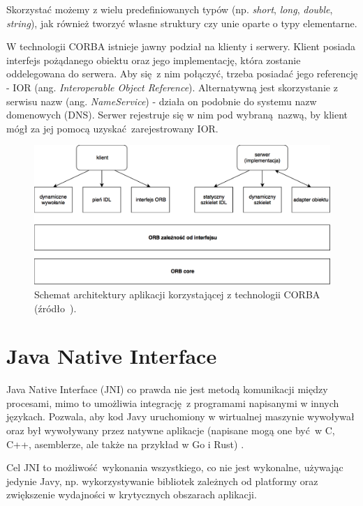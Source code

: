 Skorzystać możemy z wielu predefiniowanych typów (np. \textit{short}, \textit{long}, \textit{double}, \textit{string}), jak również tworzyć własne struktury czy unie oparte o typy elementarne.

W technologii CORBA istnieje jawny podział na klienty i serwery. Klient posiada interfejs pożądanego obiektu oraz jego implementację, która zostanie oddelegowana do serwera. Aby się z nim połączyć, trzeba posiadać jego referencję - IOR (ang. \textit{Interoperable Object Reference}). Alternatywną jest skorzystanie z serwisu nazw (ang. \textit{NameService}) - działa on podobnie do systemu nazw domenowych (DNS). Serwer rejestruje się w nim pod wybraną nazwą, by klient mógł za jej pomocą uzyskać zarejestrowany IOR.

\begin{figure}[h]
    \centering
    \includegraphics[width=\textwidth,height=\textheight,keepaspectratio]{img/CORBA_architecture.png}
    \caption{Schemat architektury aplikacji korzystającej z technologii CORBA (źródło~\cite{Saw02}).}
    \label{fig:CORBA_architecture}
\end{figure}


\section{Java Native Interface}

Java Native Interface (JNI) co prawda nie jest metodą komunikacji między procesami, mimo to umożliwia integrację z programami napisanymi w innych językach. Pozwala, aby kod Javy uruchomiony w wirtualnej maszynie wywoływał oraz był wywoływany przez natywne aplikacje (napisane mogą one być w C, C++, asemblerze, ale także na przykład w Go i Rust) \cite{JNI17}.

Cel JNI to możliwość wykonania wszystkiego, co nie jest wykonalne, używając jedynie Javy, np. wykorzystywanie bibliotek zależnych od platformy oraz zwiększenie wydajności w krytycznych obszarach aplikacji.

